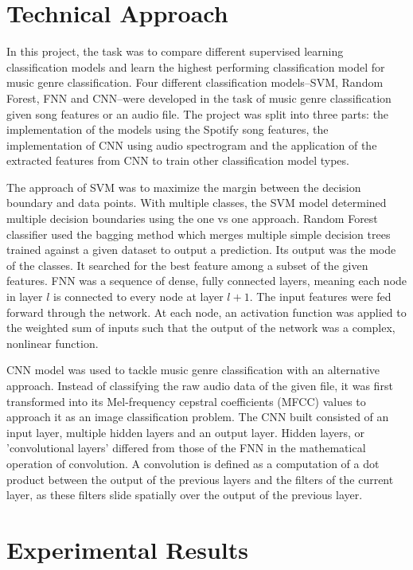 \documentclass[11.5pt]{article}
\begin{document}
\section{Technical Approach}
In this project, the task was to compare different supervised learning classification models and learn the highest performing classification model for music genre classification.  Four different classification models–SVM, Random Forest, FNN and CNN–were developed in the task of music genre classification given song features or an audio file. The project was split into three parts: the implementation of the models using the Spotify song features, the implementation of CNN using audio spectrogram and the application of the extracted features from CNN to train other classification model types.
 
The approach of SVM was to maximize the margin between the decision boundary and data points. With multiple classes, the SVM model determined multiple decision boundaries using the one vs one approach. Random Forest classifier used the bagging method which merges multiple simple decision trees trained against a given dataset to output a prediction. Its output was the mode of the classes. It searched for the best feature among a subset of the given features. FNN was a sequence of dense, fully connected layers, meaning each node in layer $l$ is connected to every node at layer $l + 1$. The input features were fed forward through the network. At each node, an activation function was applied to the weighted sum of inputs such that the output of the network was a complex, nonlinear function. 

CNN model was used to tackle music genre classification with an alternative approach. Instead of classifying the raw audio data of the given file, it was first transformed into its Mel-frequency cepstral coefficients (MFCC) values to approach it as an image classification problem. The CNN built consisted of an input layer, multiple hidden layers and an output layer. Hidden layers, or 'convolutional layers' differed from those of the FNN  in the mathematical operation of convolution. A convolution is defined as a computation of a dot product between the output of the previous layers and the filters of the current layer, as these filters slide spatially over the output of the previous layer. 

\section{Experimental Results}
\end{document}

